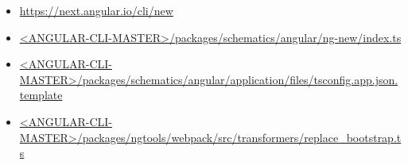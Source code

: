 


\begin{itemize}
  \item \url{https://next.angular.io/cli/new}
\end{itemize}


\begin{itemize}
  \item \href{https://github.com/angular/angular-cli/blob/master/packages/schematics/angular/ng-new/index.ts}
        {<ANGULAR-CLI-MASTER>/packages/schematics/angular/ng-new/index.ts}
\end{itemize}





\begin{itemize}
  \item \href{https://github.com/angular/angular-cli/blob/master/packages/schematics/angular/application/files/tsconfig.app.json.template}
        {<ANGULAR-CLI-MASTER>/packages/schematics/angular/application/files/tsconfig.app.json.template}
\end{itemize}





\begin{itemize}
  \item \href{https://github.com/angular/angular-cli/blob/master/packages/ngtools/webpack/src/transformers/replace_bootstrap.ts}
        {<ANGULAR-CLI-MASTER>/packages/ngtools/webpack/src/transformers/replace\_bootstrap.ts}
\end{itemize}




